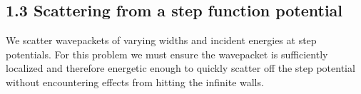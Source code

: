 \documentclass[singlepage,notitlepage,nofootinbib,11pt]{revtex4-1}
\begin{document}
\subsection*{1.3 Scattering from a step function potential}
We scatter wavepackets of varying widths and incident energies at step potentials. For this problem we must ensure the wavepacket is sufficiently localized and therefore energetic enough to quickly scatter off the step potential without encountering effects from hitting the infinite walls.
\end{document}
